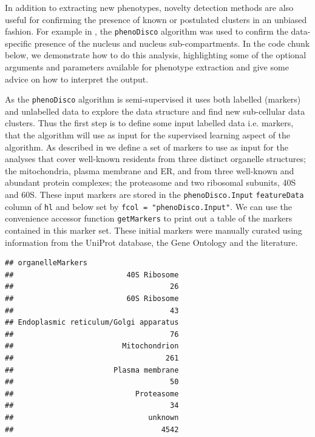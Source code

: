 In addition to extracting new phenotypes, novelty detection methods
are also useful for confirming the presence of known or postulated
clusters in an unbiased fashion. For example in \cite{hyper}, the
\texttt{phenoDisco} algorithm was used to confirm the data-specific presence
of the nucleus and nucleus sub-compartments. In the code chunk below,
we demonstrate how to do this analysis, highlighting some of the
optional arguments and parameters available for phenotype extraction
and give some advice on how to interpret the output.

As the \texttt{phenoDisco} algorithm is semi-supervised it uses both
labelled (markers) and unlabelled data to explore the data structure
and find new sub-cellular data clusters. Thus the first step is to
define some input labelled data i.e. markers, that the algorithm will
use as input for the supervised learning aspect of the algorithm. As
described in \cite{hyper} we define a set of markers to use as input
for the analyses that cover well-known residents from three distinct
organelle structures; the mitochondria, plasma membrane and ER, and
from three well-known and abundant protein complexes; the proteasome
and two ribosomal subunits, 40S and 60S.  These input markers are
stored in the \texttt{phenoDisco.Input} \texttt{featureData} column of
\texttt{hl} and below set by \texttt{fcol = "phenoDisco.Input"}. We
can use the convenience accessor function \texttt{getMarkers} to print
out a table of the markers contained in this marker set. These initial
markers were manually curated using information from the UniProt
database, the Gene Ontology and the literature.

\begin{knitrout}
\color{fgcolor}\begin{kframe}
\begin{alltt}
  \hlstd{=} \hlstd{)}
\end{alltt}
\begin{verbatim}
## organelleMarkers
##                          40S Ribosome 
##                                    26 
##                          60S Ribosome 
##                                    43 
## Endoplasmic reticulum/Golgi apparatus 
##                                    76 
##                         Mitochondrion 
##                                   261 
##                       Plasma membrane 
##                                    50 
##                            Proteasome 
##                                    34 
##                               unknown 
##                                  4542
\end{verbatim}
\end{kframe}
\end{knitrout}

